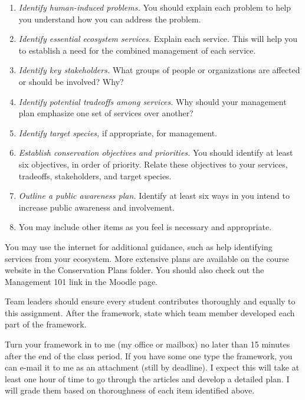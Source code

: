 \documentclass[12pt, hidelinks]{exam}
\begin{document}
\begin{enumerate}[leftmargin=*, label=\Alph*.]

	\item \emph{Identify human-induced problems.} You should explain each problem to help you understand how you can address the problem.
	
	\item \emph{Identify essential ecosystem services.} Explain each service. This will help you to establish a need for the combined management of each service.
	
	\item \emph{Identify key stakeholders.} What groups of people or organizations are affected or should be involved? Why?
	
	\item \emph{Identify potential tradeoffs among services.} Why should your management plan emphasize one set of services over another? 
	
	\item \emph{Identify target species,} if appropriate, for management.

	\item \emph{Establish conservation objectives and priorities.} You should identify at least six objectives, in order of priority. Relate these objectives to your services, tradeoffs, stakeholders, and target species.
	
	\item \emph{Outline a public awareness plan.} Identify at least six ways in you intend to increase public awareness and involvement.
	
	\item You may include other items as you feel is necessary and appropriate.
	
\end{enumerate}

You may use the internet for additional guidance, such as help identifying services from your ecosystem. More extensive plans are available on the course website in the Conservation Plans folder. You should also check out the Management 101 link in the Moodle page.

Team leaders should ensure every student contributes thoroughly and equally to this assignment. After the framework, state which team member developed each part of the framework. 

Turn your framework in to me (my office or mailbox) no later than 15 minutes after the end of the class period. If you have some one type the framework, you can e-mail it to me as an attachment (still by deadline). I expect this will take at least one hour of time to go through the articles and develop a detailed plan. I will grade them based on thoroughness of each item identified above.
\end{document}
